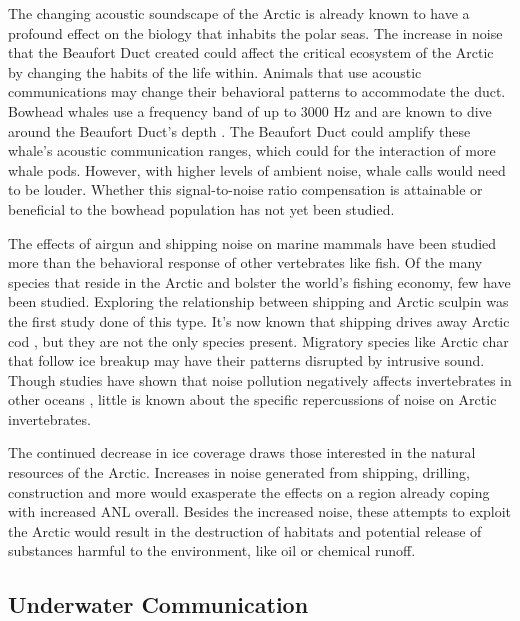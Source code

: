 The changing acoustic soundscape of the Arctic is already known to have a profound effect on the biology that inhabits the polar seas. The increase in noise that the Beaufort Duct created could affect the critical ecosystem of the Arctic by changing the habits of the life within. Animals that use acoustic communications may change their behavioral patterns to accommodate the duct. Bowhead whales use a frequency band of up to 3000 Hz \parencite{clark1984sounds} and are known to dive around the Beaufort Duct's depth \parencite{simon2009behaviour}. The Beaufort Duct could amplify these whale's acoustic communication ranges, which could for the interaction of more whale pods. However, with higher levels of ambient noise, whale calls would need to be louder. Whether this signal-to-noise ratio compensation is attainable or beneficial to the bowhead population has not yet been studied.

The effects of airgun \parencite{halliday2020potential} and shipping noise \parencite{halliday2017potential} on marine mammals have been studied more than the behavioral response of other vertebrates like fish. Of the many species that reside in the Arctic and bolster the world's fishing economy, few have been studied. Exploring the relationship between shipping and Arctic sculpin was the first study done of this type. \parencite{ivanova2018sculpin} It's now known that shipping drives away Arctic cod \parencite{ivanova2020shipping}, but they are not the only species present. Migratory species like Arctic char that follow ice breakup \parencite{hammer2021char} may have their patterns disrupted by intrusive sound. Though studies have shown that noise pollution negatively affects invertebrates in other oceans \parencite{difranco2020}, little is known about the specific repercussions of noise on Arctic invertebrates.

The continued decrease in ice coverage draws those interested in the natural resources of the Arctic. Increases in noise generated from shipping, drilling, construction \parencite{gering2020aca} and more would exasperate the effects on a region already coping with increased ANL overall. Besides the increased noise, these attempts to exploit the Arctic would result in the destruction of habitats and potential release of substances harmful to the environment, like oil or chemical runoff.


\subsection{Underwater Communication}

